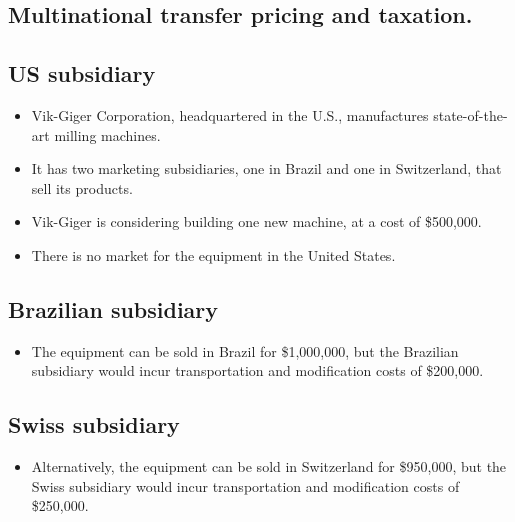 \hypertarget{multinational-transfer-pricing-and-taxation.}{%
\subsection{Multinational transfer pricing and
taxation.}\label{multinational-transfer-pricing-and-taxation.}}

\hypertarget{us-subsidiary}{%
\subsection{US subsidiary}\label{us-subsidiary}}

\begin{itemize}
\tightlist
\item
  Vik-Giger Corporation, headquartered in the U.S., manufactures
  state-of-the-art milling machines.
\item
  It has two marketing subsidiaries, one in Brazil and one in
  Switzerland, that sell its products.
\item
  Vik-Giger is considering building one new machine, at a cost of
  \$500,000.
\item
  There is no market for the equipment in the United States.
\end{itemize}

\hypertarget{brazilian-subsidiary}{%
\subsection{Brazilian subsidiary}\label{brazilian-subsidiary}}

\begin{itemize}
\tightlist
\item
  The equipment can be sold in Brazil for \$1,000,000, but the Brazilian
  subsidiary would incur transportation and modification costs of
  \$200,000.
\end{itemize}

\hypertarget{swiss-subsidiary}{%
\subsection{Swiss subsidiary}\label{swiss-subsidiary}}

\begin{itemize}
\tightlist
\item
  Alternatively, the equipment can be sold in Switzerland for \$950,000,
  but the Swiss subsidiary would incur transportation and modification
  costs of \$250,000.
\end{itemize}

